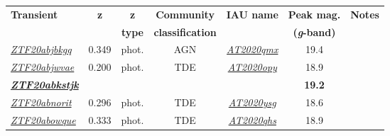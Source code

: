 \begin{table*}
  \begin{tabular}{l  c  c  c   c  c  c}
    \hline
    \textbf{Transient}                                                                                & \textbf{z}     & \textbf{z}     & \textbf{Community}      & \textbf{IAU name} & \textbf{Peak mag.}         & \textbf{Notes}       \\
                                                                                                      &                & \textbf{type}  & \textbf{classification} &                   & \textbf{(\textit{g}-band)} &                      \\
    \hline
    \hline
    \textit{\href{https://ztfnuclear.simeonreusch.com/transient/ZTF20abjbkgq}{ZTF20abjbkgq}}          & 0.349          & phot.          & AGN                     &
    \textit{\href{https://www.wis-tns.org/object/2020qmx}{AT2020qmx}}                                 & 19.4           &                                                                                                                  \\
    \textit{\href{https://ztfnuclear.simeonreusch.com/transient/ZTF20abjwvae}{ZTF20abjwvae}}          & 0.200          & phot.          & TDE                     &
    \textit{\href{https://www.wis-tns.org/object/2020opy}{AT2020opy}}                                 & 18.9           &                                                                                                                  \\
    \textbf{\textit{\href{https://ztfnuclear.simeonreusch.com/transient/ZTF20abkstjk}{ZTF20abkstjk}}} & ~              & ~              & ~                       & ~                 & \textbf{19.2}              &                      \\
    \textit{\href{https://ztfnuclear.simeonreusch.com/transient/ZTF20abnorit}{ZTF20abnorit}}          & 0.296          & phot.          & TDE                     &
    \textit{\href{https://www.wis-tns.org/object/2020ysg}{AT2020ysg}}                                 & 18.6           &                                                                                                                  \\
    \textit{\href{https://ztfnuclear.simeonreusch.com/transient/ZTF20abowque}{ZTF20abowque}}          & 0.333          & phot.          & TDE                     &
    \textit{\href{https://www.wis-tns.org/object/2020qhs}{AT2020qhs}}                                 & 18.9           &                                                                                                                  \\

\end{tabular}
\end{table*}
